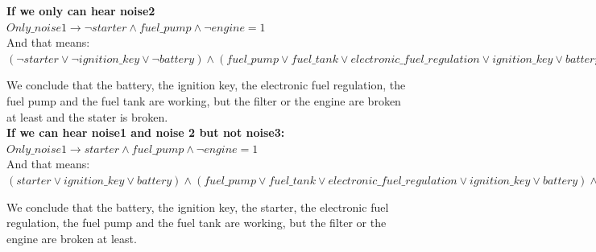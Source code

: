 \documentclass[paper=a4, fontsize=11pt]{scrartcl} %
\numberwithin{equation}{section} %
\numberwithin{figure}{section} %
\numberwithin{table}{section} %
\begin{document}
		
		
		

\textbf{If we only can hear noise2}\\
		
		$ Only\_noise1 \rightarrow  \lnot starter \land fuel\_pump \land \lnot engine = 1 $\\
		
		And that means: \\
		
$ (\lnot starter \lor \lnot ignition\_key \lor \lnot battery) \land ( fuel\_pump \lor fuel\_tank \lor electronic\_fuel\_regulation \lor ignition\_key \lor battery) \land (\lnot engine \lor \lnot filter \lor \lnot fuel\_pump \lor \lnot fuel\_tank \lor \lnot electronic\_fuel\_regulation \lor \lnot ignition\_key \lor \lnot battery \lor \lnot starter \lor \lnot ignition\_key \lor \lnot battery) = 1 $
		
		
		We conclude that the battery, the ignition key, the electronic fuel regulation, the fuel pump and the fuel tank are working, but the filter or the engine are broken at least and the stater is broken.\\
		
		

\textbf{If we can hear noise1 and noise 2 but not noise3:}\\
		
		$ Only\_noise1 \rightarrow  starter \land fuel\_pump \land \lnot engine = 1 $\\
		
		And that means: \\
		
$ ( starter \lor  ignition\_key \lor  battery) \land ( fuel\_pump \lor fuel\_tank \lor electronic\_fuel\_regulation \lor ignition\_key \lor battery) \land (\lnot engine \lor \lnot filter \lor \lnot fuel\_pump \lor \lnot fuel\_tank \lor \lnot electronic\_fuel\_regulation \lor \lnot ignition\_key \lor \lnot battery \lor \lnot starter \lor \lnot ignition\_key \lor \lnot battery) = 1 $
		
		
		We conclude that the battery, the ignition key, the starter, the electronic fuel regulation, the fuel pump and the fuel tank are working, but the filter or the engine are broken at least.\\
		
\end{document}

